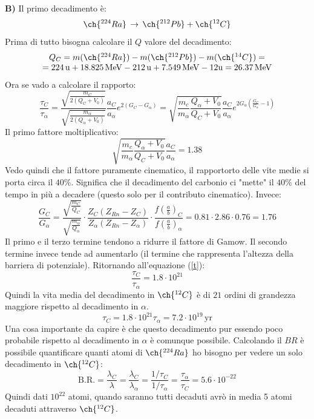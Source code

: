 \textbf{B)} Il primo decadimento è:
\begin{equation}
    \ch{^{224}Ra}\,\to\,\ch{^{212}Pb}+\ch{^{12}C}
\end{equation}
Prima di tutto bisogna calcolare il $Q$ valore del decadimento:
\begin{equation}
\begin{array}{c}
       Q_C=m(\ch{^{224}Ra})-m(\ch{^{212}Pb})-m(\ch{^{14}C})=\\
     =224\,\mathrm{u}+18.825\,\mathrm{MeV}-212\,\mathrm{u}+7.549\,\mathrm{MeV}-12\mathrm{u}=26.37\,\mathrm{MeV}
\end{array}
\end{equation}
Ora se vado a calcolare il rapporto:
\begin{equation}
    \frac{\tau_C}{\tau_\alpha}=\frac{\sqrt{\frac{m_C}{2(Q_C+V_0)}}}{\sqrt{\frac{m_\alpha}{2(Q_\alpha+V_0)}}}\frac{a_C}{a_\alpha}e^{2(G_C-G_\alpha)}=\sqrt{\frac{m_c}{m_\alpha}\frac{Q_\alpha+V_0}{Q_C+V_0}}\frac{a_C}{a_\alpha}e^{2G_\alpha\left(\frac{G_C}{G_\alpha}-1\right)}
\end{equation}
Il primo fattore moltiplicativo:
\begin{equation}\label{t}
    \sqrt{\frac{m_c}{m_\alpha}\frac{Q_\alpha+V_0}{Q_C+V_0}}\frac{a_C}{a_\alpha}=1.38
\end{equation}
Vedo quindi che il fattore puramente cinematico, il rapportorto delle vite medie si porta circa il $40\%$. Significa che il decadimento del carbonio ci "mette" il $40\%$ del tempo in più a decadere (questo solo per il contributo cinematico).
Invece:
\begin{equation}
    \frac{G_C}{G_\alpha}=\frac{\sqrt{\frac{m_C}{Q_C}}}{\sqrt{\frac{m_\alpha}{Q_\alpha}}}\cdot\frac{Z_C(Z_{Rn}-Z_C)}{Z_\alpha(Z_{Rn}-Z_\alpha)}\cdot\frac{f\left(\frac{a}{b}\right)_C}{f\left(\frac{a}{b}\right)_\alpha} = 0.81\cdot2.86\cdot 0.76=1.76
\end{equation}
Il primo e il terzo termine tendono a ridurre il fattore di Gamow. Il secondo termine invece tende ad aumentarlo (il termine che rappresenta l'altezza della barriera di potenziale). Ritornando all'equazione (\ref{t}):
\begin{equation}
     \frac{\tau_C}{\tau_\alpha}=1.8\cdot10^{21}
\end{equation}
Quindi la vita media del decadimento in $\ch{^{12}C}$ è di $21$ ordini di grandezza maggiore rispetto al decadimento in $\alpha$.
\begin{equation}
    \tau_C=1.8\cdot10^{21}\tau_\alpha=7.2\cdot10^{19}\,\mathrm{yr}
\end{equation}
Una cosa importante da capire è che questo decadimento pur essendo poco probabile rispetto al decadimento in $\alpha$ è comunque possibile. Calcolando il $BR$ è possibile quantificare quanti atomi di $\ch{^{224}Ra}$ ho bisogno per vedere un solo decadimento in $\ch{^{12}C}$:
\begin{equation}
    \mathrm{B.R.}=\frac{\lambda_C}{\lambda}=\frac{\lambda_C}{\lambda_\alpha}=\frac{1/\tau_C}{1/\tau_\alpha}=\frac{\tau_\alpha}{\tau_C}=5.6\cdot10^{-22}
\end{equation}
Quindi dati $10^{22}$ atomi, quando saranno tutti decaduti avrò in media 5 atomi decaduti attraverso $\ch{^{12}C}$.


